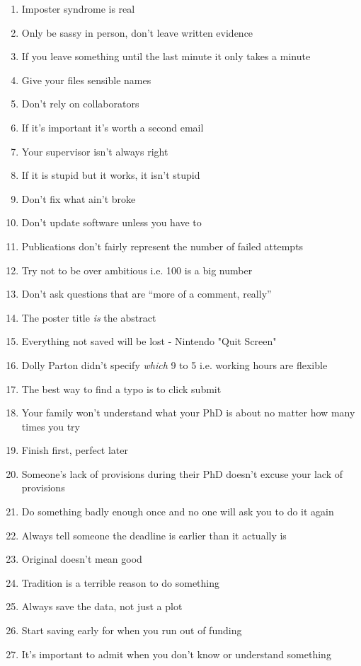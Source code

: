 \begin{enumerate}
	\item Imposter syndrome is real \cite{langford1993}
	\item Only be sassy in person, don't leave written evidence
	\item If you leave something until the last minute it only takes a minute
	\item Give your files sensible names
	\item Don't rely on collaborators
	\item If it's important it's worth a second email
	\item Your supervisor isn't always right
	\item If it is stupid but it works, it isn't stupid
	\item Don't fix what ain't broke
	\item Don't update software unless you have to
	\item Publications don't fairly represent the number of failed attempts
	\item Try not to be over ambitious i.e. 100 is a big number
	\item Don't ask questions that are ``more of a comment, really''
	\item The poster title \textit{is} the abstract
	\item Everything not saved will be lost - Nintendo "Quit Screen"
	\item Dolly Parton didn't specify \textit{which} 9 to 5 i.e. working hours are flexible
	\item The best way to find a typo is to click submit
	\item Your family won't understand what your PhD is about no matter how many times you try
	\item Finish first, perfect later
	\item Someone's lack of provisions during their PhD doesn't excuse your lack of provisions
	\item Do something badly enough once and no one will ask you to do it again
	\item Always tell someone the deadline is earlier than it actually is
	\item Original doesn't mean good
	\item Tradition is a terrible reason to do something
	\item Always save the data, not just a plot
	\item Start saving early for when you run out of funding 
	\item It's important to admit when you don't know or understand something

\end{enumerate}
